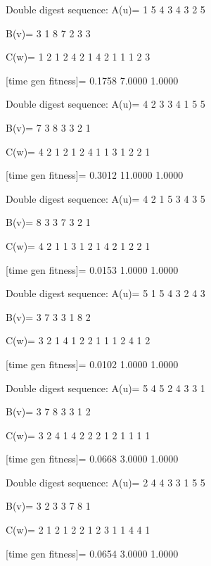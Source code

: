 Double digest sequence:
A(u)=
     1     5     4     3     4     3     2     5

B(v)=
     3     1     8     7     2     3     3

C(w)=
     1     2     1     2     4     2     1     4     2     1     1     1     2     3

[time gen fitness]=
    0.1758    7.0000    1.0000

Double digest sequence:
A(u)=
     4     2     3     3     4     1     5     5

B(v)=
     7     3     8     3     3     2     1

C(w)=
     4     2     1     2     1     2     4     1     1     3     1     2     2     1

[time gen fitness]=
    0.3012   11.0000    1.0000

Double digest sequence:
A(u)=
     4     2     1     5     3     4     3     5

B(v)=
     8     3     3     7     3     2     1

C(w)=
     4     2     1     1     3     1     2     1     4     2     1     2     2     1

[time gen fitness]=
    0.0153    1.0000    1.0000

Double digest sequence:
A(u)=
     5     1     5     4     3     2     4     3

B(v)=
     3     7     3     3     1     8     2

C(w)=
     3     2     1     4     1     2     2     1     1     1     2     4     1     2

[time gen fitness]=
    0.0102    1.0000    1.0000

Double digest sequence:
A(u)=
     5     4     5     2     4     3     3     1

B(v)=
     3     7     8     3     3     1     2

C(w)=
     3     2     4     1     4     2     2     2     1     2     1     1     1     1

[time gen fitness]=
    0.0668    3.0000    1.0000

Double digest sequence:
A(u)=
     2     4     4     3     3     1     5     5

B(v)=
     3     2     3     3     7     8     1

C(w)=
     2     1     2     1     2     2     1     2     3     1     1     4     4     1

[time gen fitness]=
    0.0654    3.0000    1.0000

